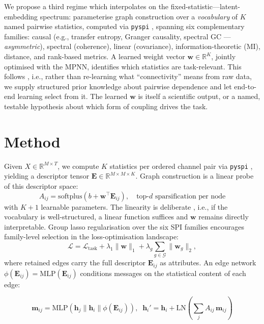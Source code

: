 \documentclass{article}
\begin{document}
We propose a third regime which interpolates on the fixed-statistic---latent-embedding spectrum: parameterise graph construction over a \emph{vocabulary} of $K$ named pairwise statistics, computed via \texttt{pyspi} \citep{cliff2023}, spanning six complementary families: causal (e.g., transfer entropy, Granger causality, spectral GC --- \emph{asymmetric}), spectral (coherence), linear (covariance), information-theoretic (MI), distance, and rank-based metrics. A learned weight vector $\mathbf{w} \in \mathbb{R}^K$, jointly optimised with the MPNN, identifies which statistics are task-relevant. This follows \citet{velickovic2022}, i.e., rather than re-learning what ``connectivity'' means from raw data, we supply structured prior knowledge about pairwise dependence and let end-to-end learning select from it. The learned $\mathbf{w}$ is itself a scientific output, or a named, testable hypothesis about which form of coupling drives the task.

\section{Method}
\label{sec:method}

Given $X \in \mathbb{R}^{M \times T}$, we compute $K$ statistics per ordered channel pair via \texttt{pyspi} \citep{cliff2023}, yielding a descriptor tensor $\mathbf{E} \in \mathbb{R}^{M \times M \times K}$. Graph construction is a linear probe of this descriptor space:
\begin{equation}
\label{eq:adj}
A_{ij} = \mathrm{softplus}\!\left(b + \mathbf{w}^\top \mathbf{E}_{ij}\right), \quad \text{top-}d \text{ sparsification per node}
\end{equation}
with $K {+} 1$ learnable parameters. The linearity is deliberate \citep[cf.][]{alain2017}, i.e., if the vocabulary is well-structured, a linear function suffices and $\mathbf{w}$ remains directly interpretable. Group lasso regularisation \citep{yuan2006} over the six SPI families encourages family-level selection in the loss-optimisation landscape:
\begin{equation}
\label{eq:loss}
\mathcal{L} = \mathcal{L}_{\mathrm{task}} + \lambda_1 \|\mathbf{w}\|_1 + \lambda_g \sum_{g \in \mathcal{G}} \|\mathbf{w}_g\|_2,
\end{equation}
where retained edges carry the full descriptor $\mathbf{E}_{ij}$ as attributes. An edge network $\phi(\mathbf{E}_{ij}) {=} \mathrm{MLP}(\mathbf{E}_{ij})$ conditions messages on the statistical content of each edge:
\begin{footnotesize}
\begin{equation}
\mathbf{m}_{ij} {=} \mathrm{MLP}\!\left(\mathbf{h}_j \| \mathbf{h}_i \| \phi(\mathbf{E}_{ij})\right)\!, \;\; \mathbf{h}_i' {=} \mathbf{h}_i {+} \mathrm{LN}\!\left(\textstyle\sum_j A_{ij}\,\mathbf{m}_{ij}\right)
\end{equation}
\end{footnotesize}
\end{document}
